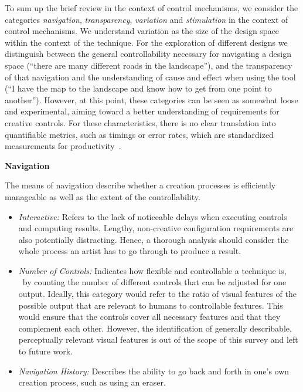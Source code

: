 To sum up the brief review in the context of control mechanisms, we consider the categories \textit{navigation}, \textit{transparency}, \textit{variation} and \textit{stimulation} in the context of control mechanisms. We understand variation as the size of the design space within the context of the technique. For the exploration of different designs we distinguish between the general controllability necessary for navigating a design space (``there are many different roads in the landscape''), and the transparency of that navigation and the understanding of cause and effect when using the tool (``I have the map to the landscape and know how to get from one point to another'').  However, at this point, these categories can be seen as somewhat loose and experimental, aiming toward a better understanding of requirements for creative controls. For these characteristics, there is no clear translation into quantifiable metrics, such as timings or error rates, which are standardized measurements for productivity~\cite{cherry_2014_qcs,shneiderman_2007_cst}.

\noindent\textbf{Navigation}

The means of navigation describe whether a creation processes is efficiently manageable as well as the extent of the controllability.

\begin{itemize}
    \item \textit{Interactive:} Refers to the lack of noticeable delays when executing controls and computing results. Lengthy, non-creative configuration requirements are also potentially distracting. Hence, a thorough analysis should consider the whole process an artist has to go through to produce a result.
    \item \textit{Number of Controls:} Indicates how flexible and controllable a technique is, \eg~by counting the number of different controls that can be adjusted for one output. 
    Ideally, this category would refer to the ratio of visual features of the possible output that are relevant to humans to controllable features. This would ensure that the controls cover all necessary features and that they complement each other. However, the identification of generally describable, perceptually relevant visual features is out of the scope of this survey and left to future work.

    \item \textit{Navigation History:} Describes the ability to go back and forth in one's own creation process, such as using an eraser.
\end{itemize}



